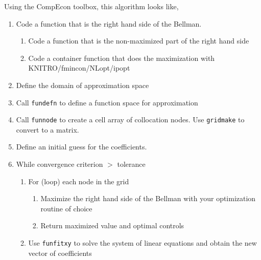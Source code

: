 \documentclass[11pt]{article}%
\begin{document}
Using the CompEcon toolbox, this algorithm looks like,
\begin{enumerate}\itemsep -.05in\vspace{-.1in}
	\item Code a function that is the right hand side of the Bellman.
	\begin{enumerate}\itemsep -.05in\vspace{-.1in}
		\item Code a function that is the non-maximized part of the right hand side
		\item Code a container function that does the maximization with KNITRO/fmincon/NLopt/ipopt
	\end{enumerate}\vspace{-.1in}
	\item Define the domain of approximation space
	\item Call \texttt{fundefn} to define a function space for approximation
	\item Call \texttt{funnode} to create a cell array of collocation nodes. Use \texttt{gridmake} to convert to a matrix.
	\item Define an initial guess for the coefficients.
	\item While convergence criterion $ > $ tolerance
	\begin{enumerate}\itemsep -.05in \vspace{-.1in}
		\item For (loop) each node in the grid
		\begin{enumerate}\itemsep -.05in \vspace{-.1in}
			\item Maximize the right hand side of the Bellman with your optimization routine of choice
			\item Return maximized value and optimal controls
		\end{enumerate}
		\item Use \texttt{funfitxy} to solve the system of linear equations and obtain the new vector of coefficients
	\end{enumerate}
\end{enumerate}
\end{document}
